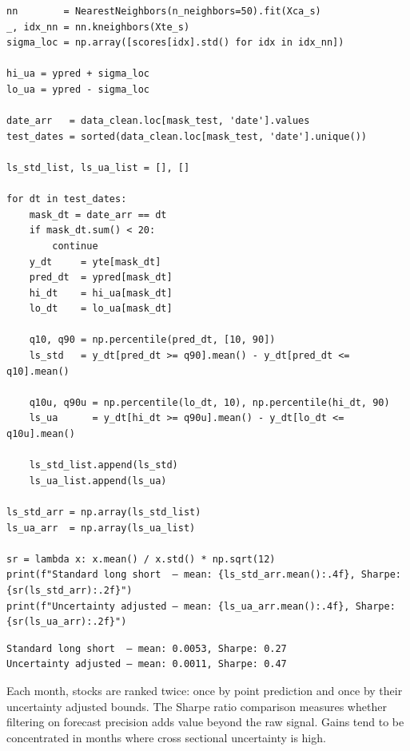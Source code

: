\begin{verbatim}
nn        = NearestNeighbors(n_neighbors=50).fit(Xca_s)
_, idx_nn = nn.kneighbors(Xte_s)
sigma_loc = np.array([scores[idx].std() for idx in idx_nn])

hi_ua = ypred + sigma_loc
lo_ua = ypred - sigma_loc

date_arr   = data_clean.loc[mask_test, 'date'].values
test_dates = sorted(data_clean.loc[mask_test, 'date'].unique())

ls_std_list, ls_ua_list = [], []

for dt in test_dates:
    mask_dt = date_arr == dt
    if mask_dt.sum() < 20:
        continue
    y_dt     = yte[mask_dt]
    pred_dt  = ypred[mask_dt]
    hi_dt    = hi_ua[mask_dt]
    lo_dt    = lo_ua[mask_dt]

    q10, q90 = np.percentile(pred_dt, [10, 90])
    ls_std   = y_dt[pred_dt >= q90].mean() - y_dt[pred_dt <= q10].mean()

    q10u, q90u = np.percentile(lo_dt, 10), np.percentile(hi_dt, 90)
    ls_ua      = y_dt[hi_dt >= q90u].mean() - y_dt[lo_dt <= q10u].mean()

    ls_std_list.append(ls_std)
    ls_ua_list.append(ls_ua)

ls_std_arr = np.array(ls_std_list)
ls_ua_arr  = np.array(ls_ua_list)

sr = lambda x: x.mean() / x.std() * np.sqrt(12)
print(f"Standard long short  — mean: {ls_std_arr.mean():.4f}, Sharpe: {sr(ls_std_arr):.2f}")
print(f"Uncertainty adjusted — mean: {ls_ua_arr.mean():.4f}, Sharpe: {sr(ls_ua_arr):.2f}")
\end{verbatim}

\begin{verbatim}
Standard long short  — mean: 0.0053, Sharpe: 0.27
Uncertainty adjusted — mean: 0.0011, Sharpe: 0.47
\end{verbatim}

Each month, stocks are ranked twice: once by point prediction and once by their uncertainty adjusted bounds. The Sharpe ratio comparison measures whether filtering on forecast precision adds value beyond the raw signal. Gains tend to be concentrated in months where cross sectional uncertainty is high.

